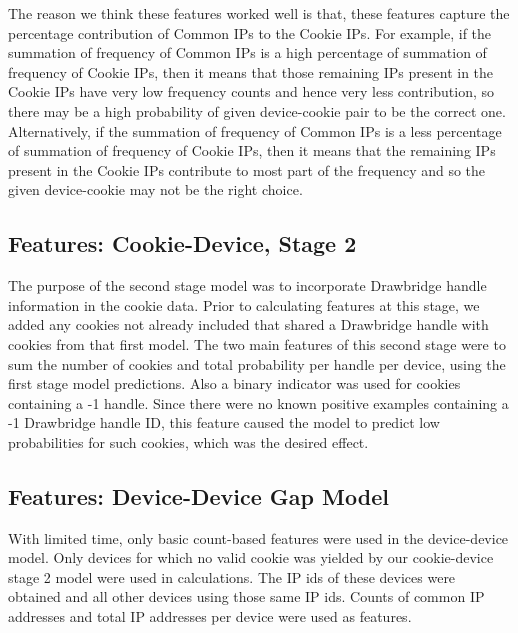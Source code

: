 \documentclass[9pt, journal]{IEEEtran}
\begin{document}
The reason we think these features worked well is that, these features capture the percentage contribution of Common IPs to the Cookie IPs. 
For example, if the summation of frequency of Common IPs is a high percentage of summation of frequency of Cookie IPs, then it means that those remaining IPs present in the Cookie IPs have very low frequency counts and hence very less contribution, so there may be a high probability of given device-cookie pair to be the correct one. 
Alternatively, if the summation of frequency of Common IPs is a less percentage of summation of frequency of Cookie IPs, then it means that the remaining IPs present in the Cookie IPs contribute to most part of the frequency and so the given device-cookie may not be the right choice.

\subsection{Features: Cookie-Device, Stage 2}
The purpose of the second stage model was to incorporate Drawbridge handle information in the cookie data. 
Prior to calculating features at this stage, we added any cookies not already included that shared a Drawbridge handle with cookies from that first model.
The two main features of this second stage were to sum the number of cookies and total probability per handle per device, using the first stage model predictions.
Also a binary indicator was used for cookies containing a -1 handle. 
Since there were no known positive examples containing a -1 Drawbridge handle ID, this feature caused the model to predict low probabilities for such cookies, which was the desired effect.


\subsection{Features: Device-Device Gap Model}
With limited time, only basic count-based features were used in the device-device model.
Only devices for which no valid cookie was yielded by our cookie-device stage 2 model were used in calculations. 
The IP ids of these devices were obtained and all other devices using those same IP ids. 
Counts of common IP addresses and total IP addresses per device were used as features.
\end{document}
